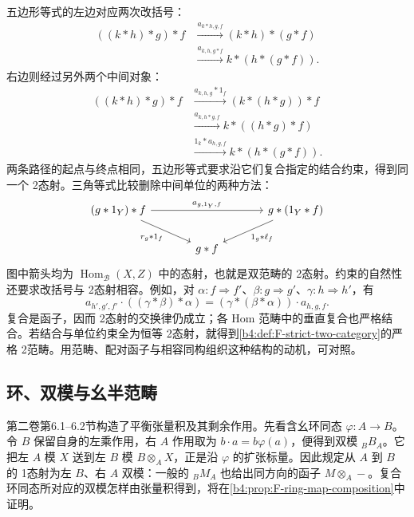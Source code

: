 五边形等式的左边对应两次改括号：
\[
	\begin{aligned}
		((k*h)*g)*f &\xrightarrow{a_{k*h,g,f}}(k*h)*(g*f)\\
		&\xrightarrow{a_{k,h,g*f}}k*(h*(g*f)).
	\end{aligned}
\]
右边则经过另外两个中间对象：
\[
	\begin{aligned}
		((k*h)*g)*f &\xrightarrow{a_{k,h,g}*1_f}(k*(h*g))*f\\
		&\xrightarrow{a_{k,h*g,f}}k*((h*g)*f)\\
		&\xrightarrow{1_k*a_{h,g,f}}k*(h*(g*f)).
	\end{aligned}
\]
两条路径的起点与终点相同，五边形等式要求沿它们复合指定的结合约束，得到同一个 2态射。三角等式比较删除中间单位的两种方法：
\[
	\begin{tikzcd}[column sep=large]
		(g*1_Y)*f\ar[rr,"a_{g,1_Y,f}"]\ar[dr,"r_g*1_f"'] &&g*(1_Y*f)\ar[dl,"1_g*\ell_f"]\\
		&g*f&
	\end{tikzcd}
\]
图中箭头均为 \(\operatorname{Hom}_{\mathcal B}(X,Z)\) 中的态射，也就是双范畴的 2态射。约束的自然性还要求改括号与 2态射相容。例如，对 \(\alpha:f\Rightarrow f'\)、\(\beta:g\Rightarrow g'\)、\(\gamma:h\Rightarrow h'\)，有
\[
	a_{h',g',f'}\cdot((\gamma*\beta)*\alpha) =(\gamma*(\beta*\alpha))\cdot a_{h,g,f}.
\]
复合是函子，因而 2态射的交换律仍成立；各 Hom 范畴中的垂直复合也严格结合。若结合与单位约束全为恒等 2态射，就得到\cref{b4:def:F-strict-two-category}的严格 2范畴。用范畴、配对函子与相容同构组织这种结构的动机，可对照\cite[Introduction, p. 1]{Benabou1967Bicategories}。

\subsection{环、双模与幺半范畴}
\label{b4:subsec:F02:02}

第二卷第6.1--6.2节构造了平衡张量积及其剩余作用。先看含幺环同态 \(\varphi:A\rightarrow B\)。令 \(B\) 保留自身的左乘作用，右 \(A\) 作用取为 \(b\cdot a=b\varphi(a)\)，便得到双模 \({}_BB_A\)。它把左 \(A\) 模 \(X\) 送到左 \(B\) 模 \(B\otimes_A X\)，正是沿 \(\varphi\) 的扩张标量。因此规定从 \(A\) 到 \(B\) 的 1态射为左 \(B\)、右 \(A\) 双模：一般的 \({}_BM_A\) 也给出同方向的函子 \(M\otimes_A-\)。复合环同态所对应的双模怎样由张量积得到，将在\cref{b4:prop:F-ring-map-composition}中证明。

